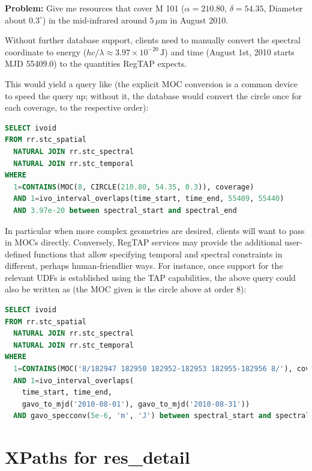 \documentclass[11pt,a4paper]{ivoa}
\begin{document}
\textbf{Problem:} Give me resources that cover M 101 ($\alpha=210.80$,
$\delta=54.35$, Diameter about $0.3^\circ$) in the mid-infrared around
$5\,\mu\textrm{m}$ in August 2010.

Without further database support, clients need to manually convert the
spectral coordinate to energy ($hc/\lambda \approx 3.97\times
10^{-20}\,\textrm{J}$) and time (August 1st, 2010 starts MJD 55409.0) to
the quantities RegTAP expects.

This would yield a query like (the explicit MOC conversion is a common
device to speed the query up; without it, the database would convert the
circle once for each coverage, to the respective order):

\begin{lstlisting}[language=SQL,flexiblecolumns=true]
SELECT ivoid
FROM rr.stc_spatial
  NATURAL JOIN rr.stc_spectral
  NATURAL JOIN rr.stc_temporal
WHERE
  1=CONTAINS(MOC(8, CIRCLE(210.80, 54.35, 0.3)), coverage)
  AND 1=ivo_interval_overlaps(time_start, time_end, 55409, 55440)
  AND 3.97e-20 between spectral_start and spectral_end
\end{lstlisting}

In particular when more complex geometries are desired, clients will
want to pass in MOCs directly.  Conversely, RegTAP services may provide
the additional user-defined functions that allow specifying temporal and
spectral constraints in different, perhaps human-friendlier ways.  For
instance, once support for the relevant UDFs is established using the
TAP capabilities, the above query
could also be written as (the MOC given is the circle above at order 8):

\begin{lstlisting}[language=SQL,basicstyle=\footnotesize]
SELECT ivoid
FROM rr.stc_spatial
  NATURAL JOIN rr.stc_spectral
  NATURAL JOIN rr.stc_temporal
WHERE
  1=CONTAINS(MOC('8/182947 182950 182952-182953 182955-182956 8/'), coverage)
  AND 1=ivo_interval_overlaps(
    time_start, time_end,
    gavo_to_mjd('2010-08-01'), gavo_to_mjd('2010-08-31'))
  AND gavo_specconv(5e-6, 'm', 'J') between spectral_start and spectral_end
\end{lstlisting}


\appendix

\section{XPaths for res\_detail}

\label{d_u_list}
\end{document}
